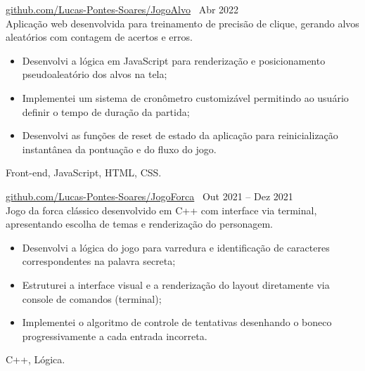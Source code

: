  \textbar{}  \href{https://github.com/Lucas-Pontes-Soares/JogoAlvo}{github.com/Lucas-Pontes-Soares/JogoAlvo} \hfill\ Abr 2022 \\
Aplicação web desenvolvida para treinamento de precisão de clique, gerando alvos aleatórios com contagem de acertos e erros.
\begin{itemize}
    \item Desenvolvi a lógica em JavaScript para renderização e posicionamento pseudoaleatório dos alvos na tela;
    \item Implementei um sistema de cronômetro customizável permitindo ao usuário definir o tempo de duração da partida;
    \item Desenvolvi as funções de reset de estado da aplicação para reinicialização instantânea da pontuação e do fluxo do jogo.
\end{itemize}
 Front-end, JavaScript, HTML, CSS.

        
 \textbar{}  \href{https://github.com/Lucas-Pontes-Soares/JogoForca}{github.com/Lucas-Pontes-Soares/JogoForca} \hfill\ Out 2021 -- Dez 2021 \\
Jogo da forca clássico desenvolvido em C++ com interface via terminal, apresentando escolha de temas e renderização do personagem.
\begin{itemize}
    \item Desenvolvi a lógica do jogo para varredura e identificação de caracteres correspondentes na palavra secreta;
    \item Estruturei a interface visual e a renderização do layout diretamente via console de comandos (terminal);
    \item Implementei o algoritmo de controle de tentativas desenhando o boneco progressivamente a cada entrada incorreta.
\end{itemize}
 C++, Lógica.